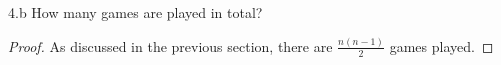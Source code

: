 \begin{exercise}{4.b}
How many games are played in total?
\end{exercise}
\begin{proof}
    As discussed in the previous section, there are $\frac{n(n-1)}{2}$ games played.
\end{proof}


